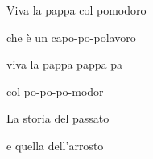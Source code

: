 \documentclass{article}
\begin{document}
Viva la pappa col pomodoro

che \`e un capo-po-polavoro

viva la pappa pappa pa

col po-po-po-modor

La storia del passato

e quella dell'arrosto
\end{document}
